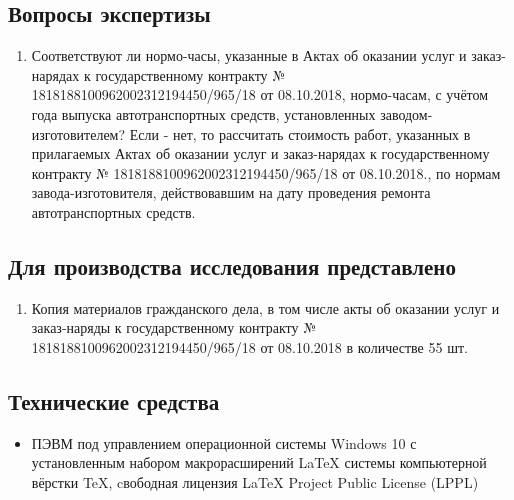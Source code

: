 \setcounter{page}{1}

%

%
\subsection{Вопросы экспертизы}

\begin{enumerate}
	\item Соответствуют ли нормо-часы, указанные в Актах об оказании услуг и заказ-нарядах к государственному контракту № 1818188100962002312194450/965/18 от 08.10.2018, нормо-часам, с учётом года выпуска автотранспортных средств, установленных заводом-изготовителем? Если - нет, то рассчитать стоимость работ, указанных в прилагаемых Актах об оказании услуг и заказ-нарядах к государственному контракту  № 1818188100962002312194450/965/18 от 08.10.2018., по нормам завода-изготовителя, действовавшим на дату проведения ремонта автотранспортных средств.
\end{enumerate}


\subsection{Для производства исследования представлено} %
\begin{enumerate}
	\item Копия материалов гражданского дела, в том числе акты об оказании услуг и заказ-наряды к государственному контракту  № 1818188100962002312194450/965/18 от 08.10.2018  в количестве 55 шт. 
	\end{enumerate}
%
%
%


\subsection{Технические средства}  %
\begin{itemize}

%

\item  ПЭВМ под управлением операционной системы Windows 10 с установленным набором макрорасширений LaTeX системы компьютерной вёрстки TeX, cвободная лицензия LaTeX Project Public License (LPPL)
%	
\end{itemize}
